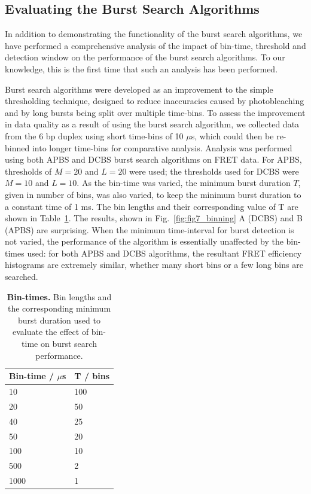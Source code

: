 \subsection{Evaluating the Burst Search Algorithms}
In addition to demonstrating the functionality of the burst search algorithms, we have performed a comprehensive analysis of the impact of bin-time, threshold and detection window on the performance of the burst search algorithms. To our knowledge, this is the first time that such an analysis has been performed.

Burst search algorithms were developed as an improvement to the simple thresholding technique, designed to reduce inaccuracies caused by photobleaching and by long bursts being split over multiple time-bins. To assess the improvement in data quality as a result of using the burst search algorithm, we collected data from the 6 bp duplex using short time-bins of 10 $\mu$s, which could then be re-binned into longer time-bins for comparative analysis. Analysis was performed using both APBS and DCBS burst search algorithms on FRET data. For APBS, thresholds of $M=20$ and $L=20$ were used; the thresholds used for DCBS were $M = 10$ and $L = 10$. As the bin-time was varied, the minimum burst duration $T$, given in number of bins, was also varied, to keep the minimum burst duration to a constant time of 1 ms. The bin lengths and their corresponding value of T are shown in Table~\ref{tab:bin-times}. The results, shown in Fig.~\ref{fig:fig7_binning} A (DCBS) and B (APBS) are surprising. When the minimum time-interval for burst detection is not varied, the performance of the algorithm is essentially unaffected by the bin-times used: for both APBS and DCBS algorithms, the resultant FRET efficiency histograms are extremely similar, whether many short bins or a few long bins are searched.


\begin{table}[!ht]
\caption{
{\bf{Bin-times}.} Bin lengths and the corresponding minimum burst duration used to evaluate the effect of bin-time on burst search performance.}
\begin{tabular}{|l|l|}
\hline
Bin-time / $\mu$s & T / bins \\
\hline
10 & 100 \\
20 & 50 \\
40 & 25 \\
50 & 20 \\
100 & 10 \\
500 & 2 \\
1000 & 1\\
\hline
\end{tabular}

\label{tab:bin-times}
\end{table}

